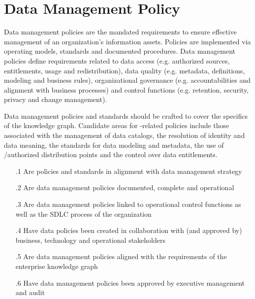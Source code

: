 \section{Data Management Policy}\label{sec:ekgmm-b-4-2} %

Data management policies are the mandated requirements to ensure effective management of an organization’s information assets.
Policies are implemented via operating models, standards and documented procedures.
Data management policies define requirements related to data access (e.g. authorized sources, entitlements, usage and redistribution),
data quality (e.g. metadata, definitions, modeling and business rules), organizational governance (e.g. accountabilities and alignment with business processes) and control functions (e.g. retention, security, privacy and change management).

\kgmmekgrationalesection

Data management policies and standards should be crafted to cover the specifics of the knowledge graph.
Candidate areas for -related policies include those associated with the management of data catalogs, the resolution of identity and data meaning, the standards for data modeling and metadata, the use of /authorized distribution points and the control over data entitlements.

\kgmmcorequestionssection

\begin{itemize}[leftmargin=.5in]

  \item [\thesection.1] Are policies and standards in alignment with data management strategy
  \item [\thesection.2] Are data management policies documented, complete and operational
  \item [\thesection.3] Are data management policies linked to operational control functions as well as the SDLC process of the organization
  \item [\thesection.4] Have data policies been created in collaboration with (and approved by) business, technology and operational stakeholders
  \item [\thesection.5] Are data management policies aligned with the requirements of the enterprise knowledge graph
  \item [\thesection.6] Have data management policies been approved by executive management and audit

\end{itemize}
